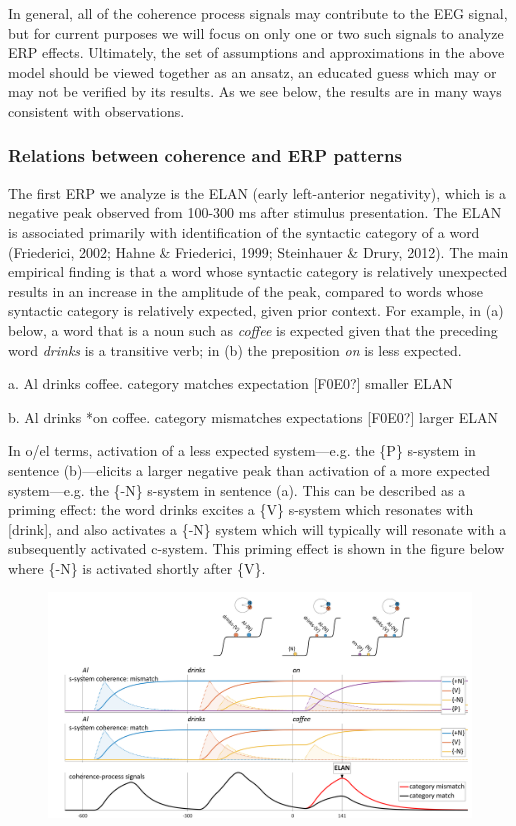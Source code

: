 In general, all of the coherence process signals may contribute to the EEG signal, but for current purposes we will focus on only one or two such signals to analyze ERP effects. Ultimately, the set of assumptions and approximations in the above model should be viewed together as an ansatz, an educated guess which may or may not be verified by its results. As we see below, the results are in many ways consistent with observations.

\subsubsection{Relations between coherence and ERP patterns}

The first ERP we analyze is the ELAN (early left-anterior negativity), which is a negative peak observed from 100-300 ms after stimulus presentation. The ELAN is associated primarily with identification of the syntactic category of a word (Friederici, 2002; Hahne \& Friederici, 1999; Steinhauer \& Drury, 2012). The main empirical finding is that a word whose syntactic category is relatively unexpected results in an increase in the amplitude of the peak, compared to words whose syntactic category is relatively expected, given prior context. For example, in (a) below, a word that is a noun such as \textit{coffee} is expected given that the preceding word \textit{drinks} is a transitive verb; in (b) the preposition \textit{on} is less expected.

a. Al drinks coffee.         category matches expectation [F0E0?] smaller ELAN

b. Al drinks *on coffee.    category mismatches expectations [F0E0?] larger ELAN

In o/el terms, activation of a less expected system—e.g. the \{P\} s-system in sentence (b)—elicits a larger negative peak than activation of a more expected system—e.g. the \{-N\} s-system in sentence (a). This can be described as a priming effect: the word drinks excites a \{V\} s-system which resonates with [drink], and also activates a \{-N\} system which will typically will resonate with a subsequently activated c-system. This priming effect is shown in the figure below where \{-N\} is activated shortly after \{V\}. 

  
\begin{figure}
\includegraphics[width=\textwidth]{figures/Tilsen-img142.png}
\caption{\missingcaption}
\label{fig:}
\end{figure}
 

